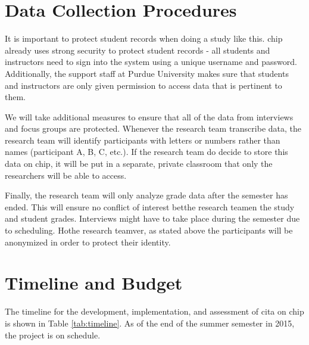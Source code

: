 \section{Data Collection Procedures}

It is important to protect student records when doing a study like this. \gls{chip} already uses strong security to protect student records - all students and instructors need to sign into the system using a unique username and password. Additionally, the support staff at Purdue University makes sure that students and instructors are only given permission to access data that is pertinent to them.

We will take additional measures to ensure that all of the data from interviews and focus groups are protected. Whenever the research team transcribe data, the research team will identify participants with letters or numbers rather than names (participant A, B, C, etc.). If the research team do decide to store this data on \gls{chip}, it will be put in a separate, private classroom that only the researchers will be able to access.

Finally, the research team will only analyze grade data after the semester has ended. This will ensure no conflict of interest betthe research teamen the study and student grades. Interviews might have to take place during the semester due to scheduling. Hothe research teamver, as stated above the participants will be anonymized in order to protect their identity.

\section{Timeline and Budget}

The timeline for the development, implementation, and assessment of \gls{cita} on \gls{chip} is shown in Table \ref{tab:timeline}. As of the end of the summer semester in 2015, the project is on schedule.

\pagebreak

